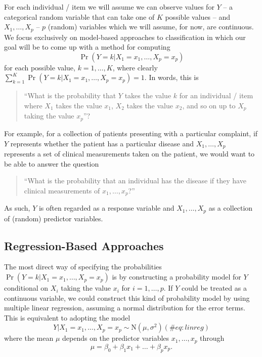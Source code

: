 \documentclass[
]{article}
\begin{document}
For each individual / item we will assume we can observe values for
\(Y\) -- a categorical random variable that can take one of \(K\)
possible values -- and \(X_1,\ldots,X_p\) -- \(p\) (random) variables
which we will assume, for now, are continuous. We focus exclusively on
model-based approaches to classification in which our goal will be to
come up with a method for computing \begin{equation*}
\Pr(Y = k | X_1 = x_1, \ldots, X_p = x_p)
\end{equation*} for each possible value, \(k = 1,\ldots, K\), where
clearly \(\sum_{k=1}^K \Pr(Y = k | X_1 = x_1, \ldots, X_p = x_p) = 1\).
In words, this is

\begin{quote}
``What is the probability that \(Y\) takes the value \(k\) for an
individual / item where \(X_1\) takes the value \(x_1\), \(X_2\) takes
the value \(x_2\), and so on up to \(X_p\) taking the value \(x_p\)''?
\end{quote}

For example, for a collection of patients presenting with a particular
complaint, if \(Y\) represents whether the patient has a particular
disease and \(X_1, \ldots, X_p\) represents a set of clinical
measurements taken on the patient, we would want to be able to answer
the question

\begin{quote}
``What is the probability that an individual has the disease if they
have clinical measurements of \(x_1,\ldots,x_p\)?''
\end{quote}

As such, \(Y\) is often regarded as a response variable and
\(X_1,\ldots,X_p\) as a collection of (random) predictor variables.

\hypertarget{subsec:regbased}{%
\subsection{Regression-Based Approaches}\label{subsec:regbased}}

The most direct way of specifying the probabilities
\(\Pr(Y = k | X_1 = x_1, \ldots, X_p = x_p)\) is by constructing a
probability model for \(Y\) conditional on \(X_i\) taking the value
\(x_i\) for \(i=1,\ldots,p\). If \(Y\) could be treated as a continuous
variable, we could construct this kind of probability model by using
multiple linear regression, assuming a normal distribution for the error
terms. This is equivalent to adopting the model \begin{equation}
Y | X_1 = x_1, \ldots, X_p = x_p \sim \mathrm{N}(\mu, \sigma^2)(\#eq:linreg)
\end{equation} where the mean \(\mu\) depends on the predictor variables
\(x_1,\ldots,x_p\) through \begin{equation*}
\mu = \beta_0 + \beta_1 x_{1} + \ldots + \beta_p x_{p}.
\end{equation*}
\end{document}
